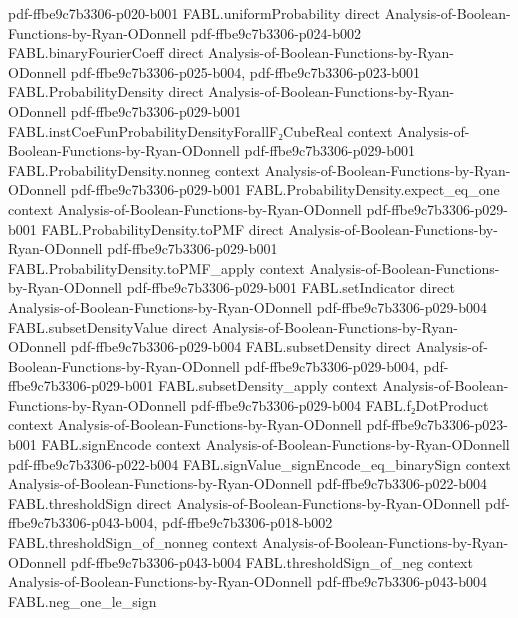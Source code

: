 \begin{theorem}
  {pdf-ffbe9c7b3306-p020-b001}
\proofstep
  {FABL.uniformProbability}
  {direct}
  {Analysis-of-Boolean-Functions-by-Ryan-ODonnell}
  {pdf-ffbe9c7b3306-p024-b002}
\proofstep
  {FABL.binaryFourierCoeff}
  {direct}
  {Analysis-of-Boolean-Functions-by-Ryan-ODonnell}
  {pdf-ffbe9c7b3306-p025-b004,
    pdf-ffbe9c7b3306-p023-b001}
\proofstep
  {FABL.ProbabilityDensity}
  {direct}
  {Analysis-of-Boolean-Functions-by-Ryan-ODonnell}
  {pdf-ffbe9c7b3306-p029-b001}
\proofstep
  {FABL.instCoeFunProbabilityDensityForallF₂CubeReal}
  {context}
  {Analysis-of-Boolean-Functions-by-Ryan-ODonnell}
  {pdf-ffbe9c7b3306-p029-b001}
\proofstep
  {FABL.ProbabilityDensity.nonneg}
  {context}
  {Analysis-of-Boolean-Functions-by-Ryan-ODonnell}
  {pdf-ffbe9c7b3306-p029-b001}
\proofstep
  {FABL.ProbabilityDensity.expect_eq_one}
  {context}
  {Analysis-of-Boolean-Functions-by-Ryan-ODonnell}
  {pdf-ffbe9c7b3306-p029-b001}
\proofstep
  {FABL.ProbabilityDensity.toPMF}
  {direct}
  {Analysis-of-Boolean-Functions-by-Ryan-ODonnell}
  {pdf-ffbe9c7b3306-p029-b001}
\proofstep
  {FABL.ProbabilityDensity.toPMF_apply}
  {context}
  {Analysis-of-Boolean-Functions-by-Ryan-ODonnell}
  {pdf-ffbe9c7b3306-p029-b001}
\proofstep
  {FABL.setIndicator}
  {direct}
  {Analysis-of-Boolean-Functions-by-Ryan-ODonnell}
  {pdf-ffbe9c7b3306-p029-b004}
\proofstep
  {FABL.subsetDensityValue}
  {direct}
  {Analysis-of-Boolean-Functions-by-Ryan-ODonnell}
  {pdf-ffbe9c7b3306-p029-b004}
\proofstep
  {FABL.subsetDensity}
  {direct}
  {Analysis-of-Boolean-Functions-by-Ryan-ODonnell}
  {pdf-ffbe9c7b3306-p029-b004,
    pdf-ffbe9c7b3306-p029-b001}
\proofstep
  {FABL.subsetDensity_apply}
  {context}
  {Analysis-of-Boolean-Functions-by-Ryan-ODonnell}
  {pdf-ffbe9c7b3306-p029-b004}
\proofstep
  {FABL.f₂DotProduct}
  {context}
  {Analysis-of-Boolean-Functions-by-Ryan-ODonnell}
  {pdf-ffbe9c7b3306-p023-b001}
\proofstep
  {FABL.signEncode}
  {context}
  {Analysis-of-Boolean-Functions-by-Ryan-ODonnell}
  {pdf-ffbe9c7b3306-p022-b004}
\proofstep
  {FABL.signValue_signEncode_eq_binarySign}
  {context}
  {Analysis-of-Boolean-Functions-by-Ryan-ODonnell}
  {pdf-ffbe9c7b3306-p022-b004}
\proofstep
  {FABL.thresholdSign}
  {direct}
  {Analysis-of-Boolean-Functions-by-Ryan-ODonnell}
  {pdf-ffbe9c7b3306-p043-b004,
    pdf-ffbe9c7b3306-p018-b002}
\proofstep
  {FABL.thresholdSign_of_nonneg}
  {context}
  {Analysis-of-Boolean-Functions-by-Ryan-ODonnell}
  {pdf-ffbe9c7b3306-p043-b004}
\proofstep
  {FABL.thresholdSign_of_neg}
  {context}
  {Analysis-of-Boolean-Functions-by-Ryan-ODonnell}
  {pdf-ffbe9c7b3306-p043-b004}
\proofstep
  {FABL.neg_one_le_sign}

\end{theorem}
